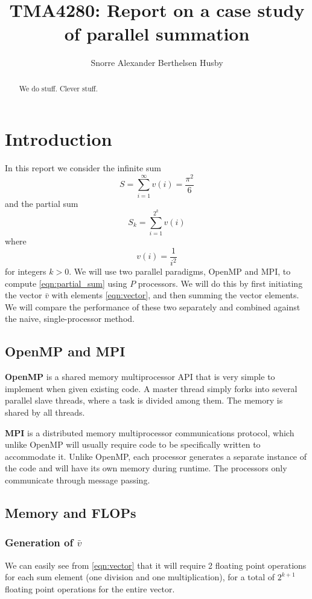 \documentclass[11pt]{article}
\title{TMA4280: Report on a case study of parallel summation}
\author{Snorre Alexander Berthelsen Husby}
\begin{document}
 
\maketitle
\begin{abstract}
We do stuff. Clever stuff.
\end{abstract}
\newpage
\section{Introduction}
In this report we consider the infinite sum
\begin{equation}\label{eqn:model_problem}
S = \sum_{i=1}^\infty v(i) = \frac{\pi^2}{6}
\end{equation}
and the partial sum
\begin{equation}\label{eqn:partial_sum}
S_k = \sum_{i=1}^{2^k} v(i)
\end{equation}
where
\begin{equation}\label{eqn:vector}
v(i) = \frac{1}{i^2}
\end{equation}
for integers $k>0$. We will use two parallel paradigms, OpenMP and MPI, to compute \eqref{eqn:partial_sum} using $P$ processors. We will do this by first initiating the vector $\bar{v}$ with elements \eqref{eqn:vector}, and then summing the vector elements. We will compare the performance of these two separately and combined against the naive, single-processor method.
\subsection{OpenMP and MPI}
\textbf{OpenMP} is a shared memory multiprocessor API that is very simple to implement when given existing code. A master thread simply forks into several parallel slave threads, where a task is divided among them. The memory is shared by all threads.

\textbf{MPI} is a distributed memory multiprocessor communications protocol, which unlike OpenMP will usually require code to be specifically written to accommodate it. Unlike OpenMP, each processor generates a separate instance of the code and will have its own memory during runtime. The processors only communicate through message passing. 
\subsection{Memory and FLOPs}
\subsubsection{Generation of $\bar{v}$}
We can easily see from \eqref{eqn:vector} that it will require 2 floating point operations for each sum element (one division and one multiplication), for a total of $2^{k+1}$ floating point operations for the entire vector. 
\end{document}
